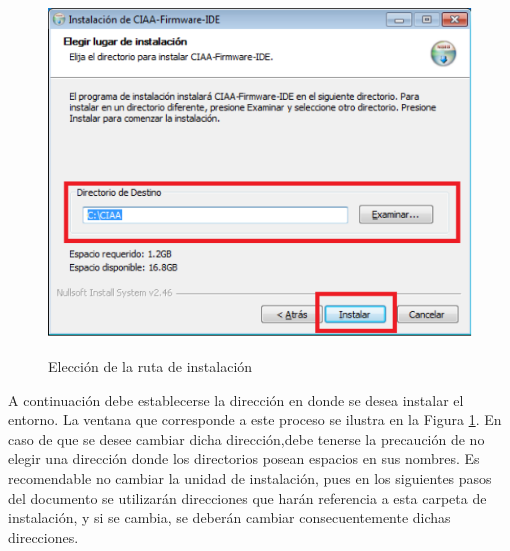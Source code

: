 \documentclass[12pt,letterpaper]{article}
\begin{document}
\begin{figure}[!h]
\centering
\includegraphics[width=8 cm]{figuras/instalacion4.png}\\
\caption{Elección de la ruta de instalación}
\label{Fig7}
\end{figure}

A continuación debe  establecerse la dirección en donde se desea instalar el entorno. La ventana que corresponde a este proceso se ilustra en la Figura \ref{Fig7}. En caso de que se desee cambiar dicha dirección,debe tenerse la precaución de no elegir una dirección donde los directorios posean espacios en sus nombres. Es recomendable no cambiar la unidad de instalación, pues en los siguientes pasos del documento se utilizarán direcciones que harán referencia a esta carpeta de instalación, y si se cambia, se deberán cambiar consecuentemente dichas direcciones.
 \\
 
\end{document}

